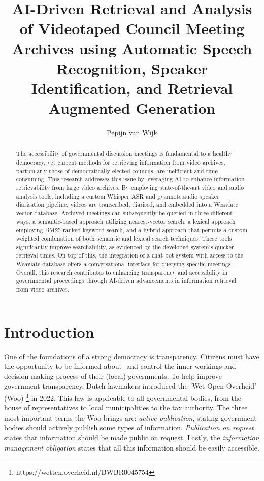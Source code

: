 \documentclass[twoside]{uva-inf-bachelor-thesis}
\title{AI-Driven Retrieval and Analysis of Videotaped Council Meeting Archives using Automatic Speech Recognition, Speaker Identification, and Retrieval Augmented Generation}
\author{Pepijn van Wijk}
\begin{document}
\maketitle

\begin{abstract}
The accessibility of governmental discussion meetings is fundamental to a healthy democracy, yet current methods for retrieving information from video archives, particularly those of democratically elected councils, are inefficient and time-consuming. This research addresses this issue by leveraging AI to enhance information retrievability from large video archives. By employing state-of-the-art video and audio analysis tools, including a custom Whisper ASR and pyannote.audio speaker diarisation pipeline, videos are transcribed, diarised, and embedded into a Weaviate vector database. 
Archived meetings can subsequently be queried in three different ways: a semantic-based approach utilizing nearest-vector search, a lexical approach employing BM25 ranked keyword search, and a hybrid approach that permits a custom weighted combination of both semantic and lexical search techniques.
These tools significantly improve searchability, as evidenced by the developed system's quicker retrieval times. On top of this, the integration of a chat bot system with access to the Weaviate database offers a conversational interface for querying specific meetings. Overall, this research contributes to enhancing transparency and accessibility in governmental proceedings through AI-driven advancements in information retrieval from video archives.
\end{abstract}

\tableofcontents

\chapter{Introduction}
One of the foundations of a strong democracy is transparency. Citizens must have the opportunity to be informed about- and control the inner workings and decision making process of their (local) governments. To help improve government transparency, Dutch lawmakers introduced the 'Wet Open Overheid' (Woo) \footnote{https://wetten.overheid.nl/BWBR0045754} in 2022. 
This law is applicable to all governmental bodies, from the house of representatives to local municipalities to the tax authority. The three most important terms the Woo brings are: \textit{active publication}, stating government bodies should actively publish some types of information. \textit{Publication on request} states that information should be made public on request. Lastly, the \textit{information management obligation} states that all this information should be easily accessible. 
\end{document}
